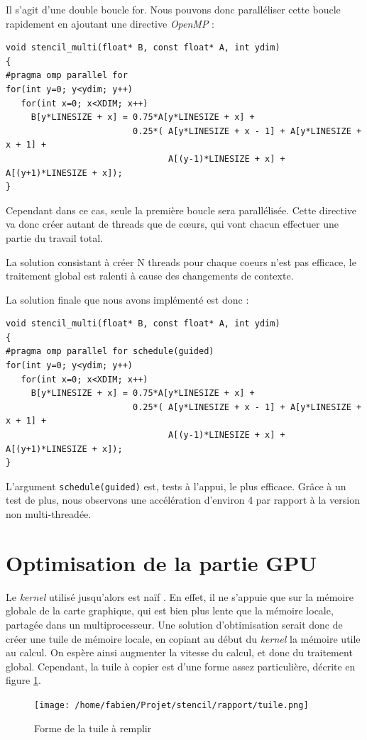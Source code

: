\documentclass{article}
\begin{document}
Il s'agit d'une double boucle for.  Nous pouvons donc paralléliser
cette boucle rapidement en ajoutant une directive \textit{OpenMP} :
\begin{verbatim}
void stencil_multi(float* B, const float* A, int ydim)
{
#pragma omp parallel for
for(int y=0; y<ydim; y++)
   for(int x=0; x<XDIM; x++)
     B[y*LINESIZE + x] = 0.75*A[y*LINESIZE + x] +
                         0.25*( A[y*LINESIZE + x - 1] + A[y*LINESIZE + x + 1] +
                                A[(y-1)*LINESIZE + x] + A[(y+1)*LINESIZE + x]);
}
\end{verbatim}
Cependant dans ce cas, seule la première boucle sera
parallélisée. Cette directive va donc créer autant de threads que de
c\oe{}urs, qui vont chacun effectuer une partie du travail total.

La solution consistant à créer N threads pour chaque coeurs n'est pas
efficace, le traitement global est ralenti à cause des changements de
contexte.

La solution finale que nous avons implémenté est donc :
\begin{verbatim}
void stencil_multi(float* B, const float* A, int ydim)
{
#pragma omp parallel for schedule(guided)
for(int y=0; y<ydim; y++)
   for(int x=0; x<XDIM; x++)
     B[y*LINESIZE + x] = 0.75*A[y*LINESIZE + x] +
                         0.25*( A[y*LINESIZE + x - 1] + A[y*LINESIZE + x + 1] +
                                A[(y-1)*LINESIZE + x] + A[(y+1)*LINESIZE + x]);
}
\end{verbatim}

L'argument \verb+schedule(guided)+ est, tests à l'appui, le plus
efficace.  Grâce à un test de plus, nous observons une accélération
d'environ 4 par rapport à la version non multi-threadée.
\section{Optimisation de la partie GPU}
Le \textit{kernel} utilisé jusqu'alors est \og naïf \fg. En effet, il
ne s'appuie que sur la mémoire globale de la carte graphique, qui est
bien plus lente que la mémoire locale, partagée dans un
multiprocesseur.  Une solution d'obtimisation serait donc de créer une
\og tuile \fg  de mémoire locale, en copiant au début du
\textit{kernel} la mémoire utile au calcul.  On espère ainsi augmenter
la vitesse du calcul, et donc du traitement global.  Cependant, la \og
tuile \fg  à copier est d'une forme assez particulière, décrite en
figure \ref{tuile}.
\begin{figure}[htp]
\texttt{[image: /home/fabien/Projet/stencil/rapport/tuile.png]}
\caption{Forme de la tuile à remplir}
\label{tuile}
\end{figure}
\end{document}
